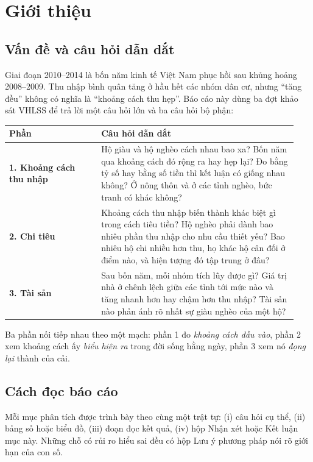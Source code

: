 \documentclass[11pt,a4paper]{article}
\begin{document}
\section{Giới thiệu}

\subsection{Vấn đề và câu hỏi dẫn dắt}
Giai đoạn 2010–2014 là bốn năm kinh tế Việt Nam phục hồi sau khủng hoảng 2008–2009. Thu nhập bình quân tăng ở hầu hết các nhóm dân cư, nhưng “tăng đều” không có nghĩa là “khoảng cách thu hẹp”. Báo cáo này dùng ba đợt khảo sát VHLSS để trả lời một câu hỏi lớn và ba câu hỏi bộ phận:

\begin{center}
\begin{tabular}{@{}p{0.30\linewidth}p{0.64\linewidth}@{}}
\toprule
\textbf{Phần} & \textbf{Câu hỏi dẫn dắt}\\
\midrule
\textbf{1. Khoảng cách thu nhập} & Hộ giàu và hộ nghèo cách nhau bao xa? Bốn năm qua khoảng cách đó rộng ra hay hẹp lại? Đo bằng tỷ số hay bằng số tiền thì kết luận có giống nhau không? Ở nông thôn và ở các tỉnh nghèo, bức tranh có khác không?\\
\addlinespace
\textbf{2. Chi tiêu} & Khoảng cách thu nhập biến thành khác biệt gì trong cách tiêu tiền? Hộ nghèo phải dành bao nhiêu phần thu nhập cho nhu cầu thiết yếu? Bao nhiêu hộ chi nhiều hơn thu, họ khác hộ cân đối ở điểm nào, và hiện tượng đó tập trung ở đâu?\\
\addlinespace
\textbf{3. Tài sản} & Sau bốn năm, mỗi nhóm tích lũy được gì? Giá trị nhà ở chênh lệch giữa các tỉnh tới mức nào và tăng nhanh hơn hay chậm hơn thu nhập? Tài sản nào phản ánh rõ nhất sự giàu nghèo của một hộ?\\
\bottomrule
\end{tabular}
\end{center}

Ba phần nối tiếp nhau theo một mạch: phần 1 đo \emph{khoảng cách đầu vào}, phần 2 xem khoảng cách ấy \emph{biểu hiện ra} trong đời sống hằng ngày, phần 3 xem nó \emph{đọng lại} thành của cải.

\subsection{Cách đọc báo cáo}
Mỗi mục phân tích được trình bày theo cùng một trật tự: (i) câu hỏi cụ thể, (ii) bảng số hoặc biểu đồ, (iii) đoạn đọc kết quả, (iv) hộp \textsf{Nhận xét} hoặc \textsf{Kết luận mục này}. Những chỗ có rủi ro hiểu sai đều có hộp \textsf{Lưu ý phương pháp} nói rõ giới hạn của con số.
\end{document}
